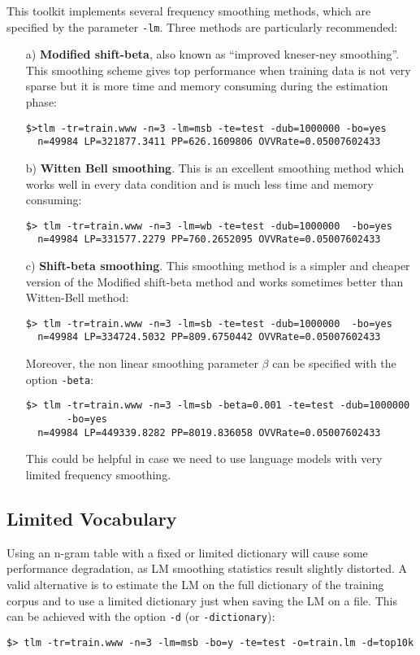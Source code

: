 \noindent
This toolkit implements several frequency smoothing methods, which are
specified  by  the  parameter  {\tt -lm}.  Three  methods  are  particularly
recommended:
\begin{itemize}
\item [a)] {\bf Modified shift-beta}, also known as  ``improved kneser-ney smoothing''.  
This smoothing scheme gives top performance when training data is not 
very sparse but it is more time and memory consuming during the estimation phase: 

\begin{verbatim}
$>tlm -tr=train.www -n=3 -lm=msb -te=test -dub=1000000 -bo=yes
  n=49984 LP=321877.3411 PP=626.1609806 OVVRate=0.05007602433
\end{verbatim}


\item [b)] {\bf Witten Bell smoothing}. This is an excellent smoothing
   method which works well in every data condition and is much less time and memory consuming:

\begin{verbatim}
$> tlm -tr=train.www -n=3 -lm=wb -te=test -dub=1000000  -bo=yes
  n=49984 LP=331577.2279 PP=760.2652095 OVVRate=0.05007602433
\end{verbatim}

\item [c)] {\bf Shift-beta smoothing}. This smoothing method is a simpler and cheaper version
of the Modified shift-beta method and works sometimes better than Witten-Bell method: 

\begin{verbatim}
$> tlm -tr=train.www -n=3 -lm=sb -te=test -dub=1000000  -bo=yes
  n=49984 LP=334724.5032 PP=809.6750442 OVVRate=0.05007602433
\end{verbatim}

\noindent
Moreover, the non linear smoothing parameter $\beta$ can be specified with the option {\tt -beta}:
\begin{verbatim}
$> tlm -tr=train.www -n=3 -lm=sb -beta=0.001 -te=test -dub=1000000  
       -bo=yes
  n=49984 LP=449339.8282 PP=8019.836058 OVVRate=0.05007602433
\end{verbatim}
This could be helpful in case we need to use language models with very limited frequency smoothing.

\end{itemize}
\subsection*{Limited Vocabulary}
\noindent
Using an  n-gram table  with a fixed  or limited  dictionary  will cause
some performance  degradation, as LM smoothing  statistics result
slightly distorted. A  valid alternative is to estimate  the LM on the
full dictionary of the training corpus and to use a limited dictionary
just when  saving the  LM on a  file.  This  can be achieved  with the
option {\tt -d} (or {\tt -dictionary}):
\begin{verbatim}
$> tlm -tr=train.www -n=3 -lm=msb -bo=y -te=test -o=train.lm -d=top10k
\end{verbatim}